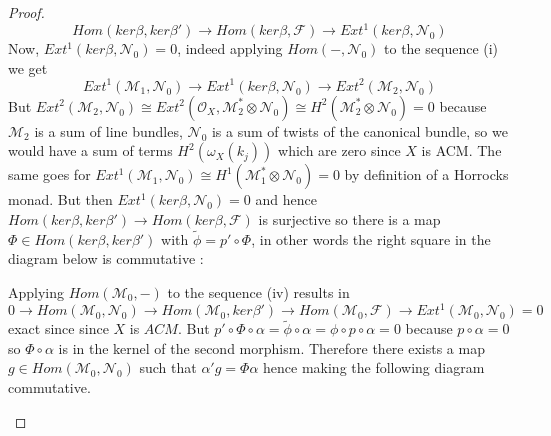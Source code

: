 \documentclass[
	oldfontcommands,
	sumario=abnt-6027-2012,
	12pt,			%
	openright,		%
	oneside,		%
	a4paper,		%
	english,		%
	brazil			%
	]{imecc-unicamp}
\begin{document}
\begin{proof}
\begin{equation}
Hom(ker \beta, ker \beta') \to Hom (ker \beta , \mathcal{F}) \to Ext^1(ker \beta, \mathcal{N}_0)
\end{equation}
Now, $Ext^1(ker \beta, \mathcal{N}_0)=0$, indeed applying $Hom(-,\mathcal{N}_0)$ to the sequence (i) we get
\begin{equation}
Ext^1(\mathcal{M}_1,\mathcal{N}_0) \to Ext^1(ker \beta, \mathcal{N}_0) \to Ext^2(\mathcal{M}_2, \mathcal{N}_0) 
\end{equation} But $Ext^2(\mathcal{M}_2,\mathcal{N}_0) \cong Ext^2(\mathcal{O}_X,\mathcal{M}_2^* \otimes \mathcal{N}_0)\cong H^2(\mathcal{M}_2^* \otimes \mathcal{N}_0)=0$ because $\mathcal{M}_2$ is a sum of line bundles, $\mathcal{N}_0$ is a sum of twists of the canonical bundle, so we would have a sum of terms $H^2(\omega_X(k_j))$ which are zero since $X$ is ACM. The same goes for $Ext^1(\mathcal{M}_1,\mathcal{N}_0)\cong H^1(\mathcal{M}_1^* \otimes \mathcal{N}_0)=0$ by definition of a Horrocks monad. But then $Ext^1(ker \beta, \mathcal{N}_0)=0$ and hence $Hom(ker \beta, ker \beta') \to Hom(ker \beta,\mathcal{F})$ is surjective so there is a map $\Phi \in Hom(ker \beta, ker \beta')$ with $\tilde{\phi}=p' \circ \Phi$, in other words the right square in the diagram below is commutative :
\begin{center}
\end{center}
Applying $Hom(\mathcal{M}_0,-)$ to the sequence (iv) results in 
\begin{equation}
0 \to Hom(\mathcal{M}_0,\mathcal{N}_0) \to Hom(\mathcal{M}_0, ker \beta') \to Hom(\mathcal{M}_0,\mathcal{F}) \to Ext^1(\mathcal{M}_0,\mathcal{N}_0) = 0
\end{equation}
exact since since $X$ is $ACM$. But $p' \circ \Phi \circ \alpha =\tilde{\phi} \circ \alpha = \phi \circ p \circ \alpha=0$ because $p \circ \alpha =0$ so $\Phi \circ \alpha$ is in the kernel of the second morphism. Therefore there exists a map $g \in Hom(\mathcal{M}_0,\mathcal{N}_0)$ such that $\alpha ' g = \Phi \alpha$ hence making the following diagram commutative.
\begin{center}

\end{center}
\end{proof}
\end{document}

